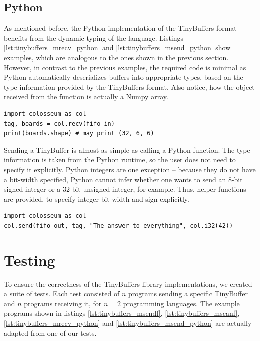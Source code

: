 \newpage
\subsection{Python}

As mentioned before, the Python implementation of the TinyBuffers format benefits from the dynamic typing of the language. Listings \ref{lst:tinybuffers_mrecv_python} and \ref{lst:tinybuffers_msend_python} show examples, which are analogous to the ones shown in the previous section. However, in contrast to the previous examples, the required code is minimal as Python automatically deserializes buffers into appropriate types, based on the type information provided by the TinyBuffers format. Also notice, how the  object received from the  function is actually a Numpy array.

\begin{lstlisting}[caption={Receiving an array of Pentago boards in Python.},label={lst:tinybuffers_mrecv_python}]
import colosseum as col
tag, boards = col.recv(fifo_in)
print(boards.shape) # may print (32, 6, 6) 
\end{lstlisting}

Sending a TinyBuffer is almost as simple as calling a Python function. The type information is taken from the Python runtime, so the user does not need to specify it explicitly. Python integers are one exception -- because they do not have a bit-width specified, Python cannot infer whether one wants to send an 8-bit signed integer or a 32-bit unsigned integer, for example. Thus, helper functions are provided, to specify integer bit-width and sign explicitly.

\begin{lstlisting}[caption={Sending a string and a number in Python.},label={lst:tinybuffers_msend_python}]
import colosseum as col
col.send(fifo_out, tag, "The answer to everything", col.i32(42))
\end{lstlisting}

\section{Testing}

To ensure the correctness of the TinyBuffers library implementations, we created a suite of tests. Each test consisted of $n$ programs sending a specific TinyBuffer and $n$ programs receiving it, for $n = 2$ programming languages. The example programs shown in listings \ref{lst:tinybuffers_msendf}, \ref{lst:tinybuffers_mscanf}, \ref{lst:tinybuffers_mrecv_python} and \ref{lst:tinybuffers_msend_python} are actually adapted from one of our tests.

